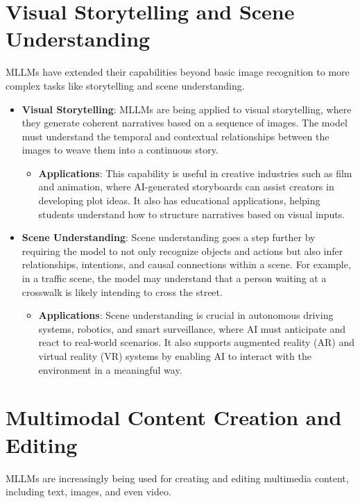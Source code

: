 \section{Visual Storytelling and Scene Understanding}

MLLMs have extended their capabilities beyond basic image recognition to more complex tasks like storytelling and scene understanding.

\begin{itemize}
    \item \textbf{Visual Storytelling}: MLLMs are being applied to visual storytelling, where they generate coherent narratives based on a sequence of images. The model must understand the temporal and contextual relationships between the images to weave them into a continuous story.
    \begin{itemize}
        \item \textbf{Applications}: This capability is useful in creative industries such as film and animation, where AI-generated storyboards can assist creators in developing plot ideas. It also has educational applications, helping students understand how to structure narratives based on visual inputs.
    \end{itemize}
    \item \textbf{Scene Understanding}: Scene understanding goes a step further by requiring the model to not only recognize objects and actions but also infer relationships, intentions, and causal connections within a scene. For example, in a traffic scene, the model may understand that a person waiting at a crosswalk is likely intending to cross the street.
    \begin{itemize}
        \item \textbf{Applications}: Scene understanding is crucial in autonomous driving systems, robotics, and smart surveillance, where AI must anticipate and react to real-world scenarios. It also supports augmented reality (AR) and virtual reality (VR) systems by enabling AI to interact with the environment in a meaningful way.
    \end{itemize}
\end{itemize}

\section{Multimodal Content Creation and Editing}

MLLMs are increasingly being used for creating and editing multimedia content, including text, images, and even video.

